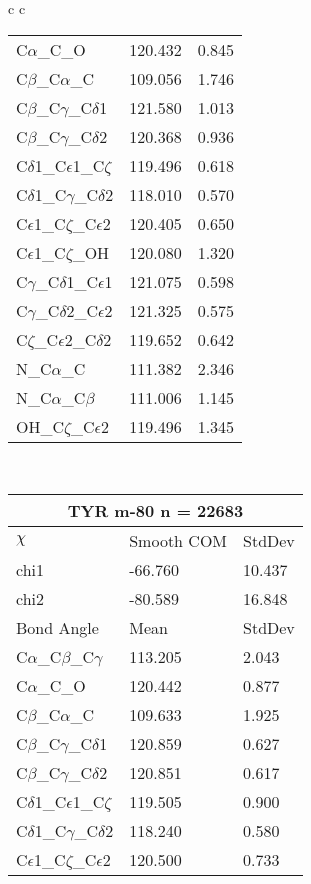 \begin{longtable}{ c c }
\begin{tabular}{ l l l }
  C$\alpha$\_C\_O & 120.432 & 0.845\\
  C$\beta$\_C$\alpha$\_C & 109.056 & 1.746\\
  C$\beta$\_C$\gamma$\_C$\delta$1 & 121.580 & 1.013\\
  C$\beta$\_C$\gamma$\_C$\delta$2 & 120.368 & 0.936\\
  C$\delta$1\_C$\epsilon$1\_C$\zeta$ & 119.496 & 0.618\\
  C$\delta$1\_C$\gamma$\_C$\delta$2 & 118.010 & 0.570\\
  C$\epsilon$1\_C$\zeta$\_C$\epsilon$2 & 120.405 & 0.650\\
  C$\epsilon$1\_C$\zeta$\_OH & 120.080 & 1.320\\
  C$\gamma$\_C$\delta$1\_C$\epsilon$1 & 121.075 & 0.598\\
  C$\gamma$\_C$\delta$2\_C$\epsilon$2 & 121.325 & 0.575\\
  C$\zeta$\_C$\epsilon$2\_C$\delta$2 & 119.652 & 0.642\\
  N\_C$\alpha$\_C & 111.382 & 2.346\\
  N\_C$\alpha$\_C$\beta$ & 111.006 & 1.145\\
  OH\_C$\zeta$\_C$\epsilon$2 & 119.496 & 1.345\\
  \bottomrule
  \end{tabular}
  \\
  \begin{tabular}{ l l l }
  \toprule
  \multicolumn{3}{c}{TYR \textbf{m-80} n = 22683} \\ \toprule
  $\chi$       & Smooth COM & StdDev \\ \midrule
  chi1 & -66.760 & 10.437 \\ 
  chi2 & -80.589 & 16.848 \\ \midrule
  Bond Angle   & Mean     & StdDev \\ \midrule
  C$\alpha$\_C$\beta$\_C$\gamma$ & 113.205 & 2.043\\
  C$\alpha$\_C\_O & 120.442 & 0.877\\
  C$\beta$\_C$\alpha$\_C & 109.633 & 1.925\\
  C$\beta$\_C$\gamma$\_C$\delta$1 & 120.859 & 0.627\\
  C$\beta$\_C$\gamma$\_C$\delta$2 & 120.851 & 0.617\\
  C$\delta$1\_C$\epsilon$1\_C$\zeta$ & 119.505 & 0.900\\
  C$\delta$1\_C$\gamma$\_C$\delta$2 & 118.240 & 0.580\\
  C$\epsilon$1\_C$\zeta$\_C$\epsilon$2 & 120.500 & 0.733\\

\end{tabular}
\end{longtable}
